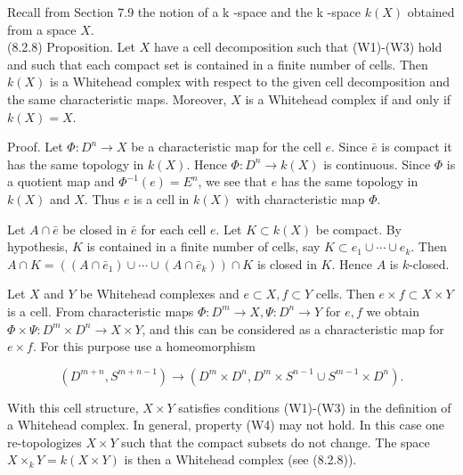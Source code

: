 \documentclass[10pt, letterpaper]{article}
\begin{document}
Recall from Section 7.9 the notion of a k -space and the k -space $k(X)$ obtained from a space $X$.\\
(8.2.8) Proposition. Let $X$ have a cell decomposition such that (W1)-(W3) hold and such that each compact set is contained in a finite number of cells. Then $k(X)$ is a Whitehead complex with respect to the given cell decomposition and the same characteristic maps. Moreover, $X$ is a Whitehead complex if and only if $k(X)=X$.

Proof. Let $\Phi: D^{n} \rightarrow X$ be a characteristic map for the cell $e$. Since $\bar{e}$ is compact it has the same topology in $k(X)$. Hence $\Phi: D^{n} \rightarrow k(X)$ is continuous. Since $\Phi$ is a quotient map and $\Phi^{-1}(e)=E^{n}$, we see that $e$ has the same topology in $k(X)$ and $X$. Thus $e$ is a cell in $k(X)$ with characteristic map $\Phi$.

Let $A \cap \bar{e}$ be closed in $\bar{e}$ for each cell $e$. Let $K \subset k(X)$ be compact. By hypothesis, $K$ is contained in a finite number of cells, say $K \subset e_{1} \cup \cdots \cup e_{k}$. Then $A \cap K=\left(\left(A \cap \bar{e}_{1}\right) \cup \cdots \cup\left(A \cap \bar{e}_{k}\right)\right) \cap K$ is closed in $K$. Hence $A$ is $k$-closed.

Let $X$ and $Y$ be Whitehead complexes and $e \subset X, f \subset Y$ cells. Then $e \times f \subset X \times Y$ is a cell. From characteristic maps $\Phi: D^{m} \rightarrow X, \Psi: D^{n} \rightarrow Y$ for $e, f$ we obtain $\Phi \times \Psi: D^{m} \times D^{n} \rightarrow X \times Y$, and this can be considered as a characteristic map for $e \times f$. For this purpose use a homeomorphism

$$
\left(D^{m+n}, S^{m+n-1}\right) \rightarrow\left(D^{m} \times D^{n}, D^{m} \times S^{n-1} \cup S^{m-1} \times D^{n}\right) .
$$

With this cell structure, $X \times Y$ satisfies conditions (W1)-(W3) in the definition of a Whitehead complex. In general, property (W4) may not hold. In this case one re-topologizes $X \times Y$ such that the compact subsets do not change. The space $X \times_{k} Y=k(X \times Y)$ is then a Whitehead complex (see (8.2.8)).
\end{document}
